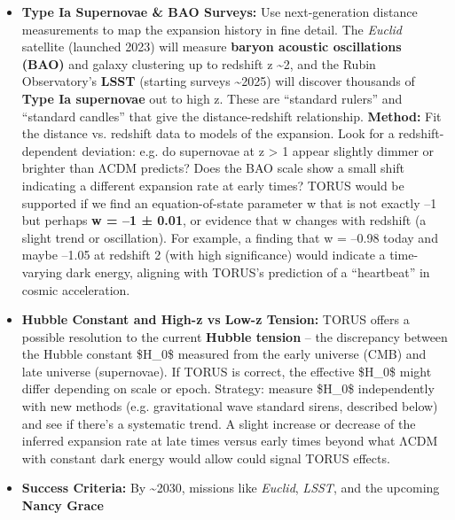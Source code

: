 \documentclass[
]{article}
\begin{document}
\begin{itemize}
  \begin{itemize}
  \item
    \textbf{Type Ia Supernovae \& BAO Surveys:} Use next-generation
    distance measurements to map the expansion history in fine detail.
    The \emph{Euclid} satellite (launched 2023) will measure
    \textbf{baryon acoustic oscillations (BAO)} and galaxy clustering up
    to redshift z \textasciitilde2, and the Rubin Observatory's
    \textbf{LSST} (starting surveys \textasciitilde2025) will discover
    thousands of \textbf{Type Ia supernovae} out to high z. These are
    ``standard rulers'' and ``standard candles'' that give the
    distance-redshift relationship. \textbf{Method:} Fit the distance
    vs. redshift data to models of the expansion. Look for a
    redshift-dependent deviation: e.g. do supernovae at z \textgreater{}
    1 appear slightly dimmer or brighter than ΛCDM predicts? Does the
    BAO scale show a small shift indicating a different expansion rate
    at early times? TORUS would be supported if we find an
    equation-of-state parameter w that is not exactly --1 but perhaps
    \textbf{w = --1 ± 0.01}, or evidence that w changes with redshift (a
    slight trend or oscillation)\hspace{0pt}. For example, a finding
    that w = --0.98 today and maybe --1.05 at redshift 2 (with high
    significance) would indicate a time-varying dark energy, aligning
    with TORUS's prediction of a ``heartbeat'' in cosmic
    acceleration\hspace{0pt}.
  \item
    \textbf{Hubble Constant and High-z vs Low-z Tension:} TORUS offers a
    possible resolution to the current \textbf{Hubble tension} -- the
    discrepancy between the Hubble constant \$H\_0\$ measured from the
    early universe (CMB) and late universe (supernovae)\hspace{0pt}. If
    TORUS is correct, the effective \$H\_0\$ might differ depending on
    scale or epoch. Strategy: measure \$H\_0\$ independently with new
    methods (e.g. gravitational wave standard sirens, described below)
    and see if there's a systematic trend. A slight increase or decrease
    of the inferred expansion rate at late times versus early times
    beyond what ΛCDM with constant dark energy would allow could signal
    TORUS effects\hspace{0pt}.
  \item
    \textbf{Success Criteria:} By \textasciitilde2030, missions like
    \emph{Euclid}, \emph{LSST}, and the upcoming \textbf{Nancy Grace
}
\end{itemize}
\end{itemize}
\end{document}
